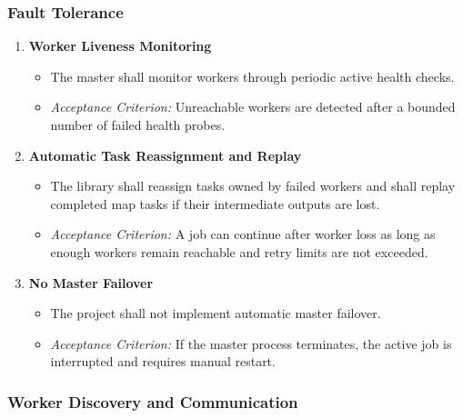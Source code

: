 \documentclass{scrartcl}
\begin{document}
\subsubsection{Fault Tolerance}

\begin{enumerate}[label=\textbf{FR-FT-\arabic*}]
    \item \textbf{Worker Liveness Monitoring}
          \begin{itemize}
              \item The master shall monitor workers through periodic active health checks.
              \item \textit{Acceptance Criterion:} Unreachable workers are detected after a bounded number of failed health probes.
          \end{itemize}

    \item \textbf{Automatic Task Reassignment and Replay}
          \begin{itemize}
              \item The library shall reassign tasks owned by failed workers and shall replay completed map tasks if their intermediate outputs are lost.
              \item \textit{Acceptance Criterion:} A job can continue after worker loss as long as enough workers remain reachable and retry limits are not exceeded.
          \end{itemize}

    \item \textbf{No Master Failover}
          \begin{itemize}
              \item The project shall not implement automatic master failover.
              \item \textit{Acceptance Criterion:} If the master process terminates, the active job is interrupted and requires manual restart.
          \end{itemize}
\end{enumerate}

\subsubsection{Worker Discovery and Communication}
\end{document}
